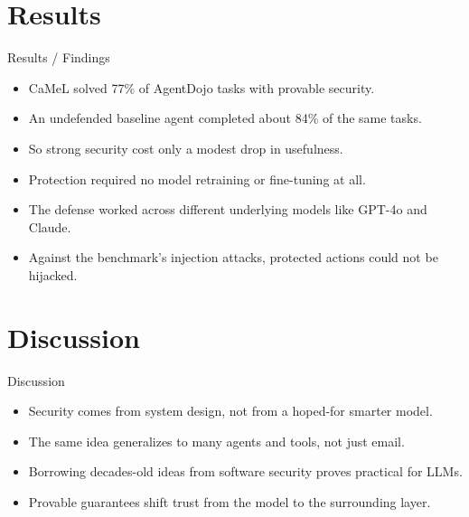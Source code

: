 \documentclass[10pt]{beamer}
\begin{document}
\section{Results}
\begin{frame}[allowframebreaks]{Results / Findings}
\begin{itemize}
  \item CaMeL solved 77\% of AgentDojo tasks with provable security.
  \item An undefended baseline agent completed about 84\% of the same tasks.
  \item So strong security cost only a modest drop in usefulness.
  \item Protection required no model retraining or fine-tuning at all.
  \item The defense worked across different underlying models like GPT-4o and Claude.
  \item Against the benchmark's injection attacks, protected actions could not be hijacked.
\end{itemize}
\end{frame}
\section{Discussion}
\begin{frame}{Discussion}
\begin{itemize}
  \item Security comes from system design, not from a hoped-for smarter model.
  \item The same idea generalizes to many agents and tools, not just email.
  \item Borrowing decades-old ideas from software security proves practical for LLMs.
  \item Provable guarantees shift trust from the model to the surrounding layer.
\end{itemize}
\end{frame}
\end{document}
